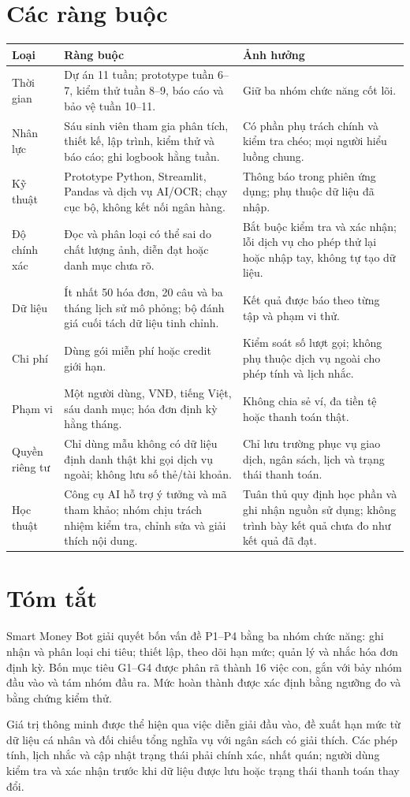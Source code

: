 \documentclass[11pt,a4paper]{article}
\newcommand{\thead}[1]{\rowcolor{tablehead}#1\\\midrule}
\begin{document}
\section{Các ràng buộc}
\begin{longtable}{@{}P{2cm}P{8cm}P{5.45cm}@{}}
\toprule\thead{\textbf{Loại}&\textbf{Ràng buộc}&\textbf{Ảnh hưởng}}
\endhead
Thời gian&Dự án 11 tuần; prototype tuần 6--7, kiểm thử tuần 8--9, báo cáo và bảo vệ tuần 10--11.&Giữ ba nhóm chức năng cốt lõi.\\\midrule
Nhân lực&Sáu sinh viên tham gia phân tích, thiết kế, lập trình, kiểm thử và báo cáo; ghi logbook hằng tuần.&Có phần phụ trách chính và kiểm tra chéo; mọi người hiểu luồng chung.\\\midrule
Kỹ thuật&Prototype Python, Streamlit, Pandas và dịch vụ AI/OCR; chạy cục bộ, không kết nối ngân hàng.&Thông báo trong phiên ứng dụng; phụ thuộc dữ liệu đã nhập.\\\midrule
Độ chính xác&Đọc và phân loại có thể sai do chất lượng ảnh, diễn đạt hoặc danh mục chưa rõ.&Bắt buộc kiểm tra và xác nhận; lỗi dịch vụ cho phép thử lại hoặc nhập tay, không tự tạo dữ liệu.\\\midrule
Dữ liệu&Ít nhất 50 hóa đơn, 20 câu và ba tháng lịch sử mô phỏng; bộ đánh giá cuối tách dữ liệu tinh chỉnh.&Kết quả được báo theo từng tập và phạm vi thử.\\\midrule
Chi phí&Dùng gói miễn phí hoặc credit giới hạn.&Kiểm soát số lượt gọi; không phụ thuộc dịch vụ ngoài cho phép tính và lịch nhắc.\\\midrule
Phạm vi&Một người dùng, VNĐ, tiếng Việt, sáu danh mục; hóa đơn định kỳ hằng tháng.&Không chia sẻ ví, đa tiền tệ hoặc thanh toán thật.\\\midrule
Quyền riêng tư&Chỉ dùng mẫu không có dữ liệu định danh thật khi gọi dịch vụ ngoài; không lưu số thẻ/tài khoản.&Chỉ lưu trường phục vụ giao dịch, ngân sách, lịch và trạng thái thanh toán.\\\midrule
Học thuật&Công cụ AI hỗ trợ ý tưởng và mã tham khảo; nhóm chịu trách nhiệm kiểm tra, chỉnh sửa và giải thích nội dung.&Tuân thủ quy định học phần và ghi nhận nguồn sử dụng; không trình bày kết quả chưa đo như kết quả đã đạt.\\\bottomrule
\end{longtable}

\section{Tóm tắt}
Smart Money Bot giải quyết bốn vấn đề P1--P4 bằng ba nhóm chức năng: ghi nhận và phân loại chi tiêu; thiết lập, theo dõi hạn mức; quản lý và nhắc hóa đơn định kỳ. Bốn mục tiêu G1--G4 được phân rã thành 16 việc con, gắn với bảy nhóm đầu vào và tám nhóm đầu ra. Mức hoàn thành được xác định bằng ngưỡng đo và bằng chứng kiểm thử.

Giá trị thông minh được thể hiện qua việc diễn giải đầu vào, đề xuất hạn mức từ dữ liệu cá nhân và đối chiếu tổng nghĩa vụ với ngân sách có giải thích. Các phép tính, lịch nhắc và cập nhật trạng thái phải chính xác, nhất quán; người dùng kiểm tra và xác nhận trước khi dữ liệu được lưu hoặc trạng thái thanh toán thay đổi.
\end{document}
